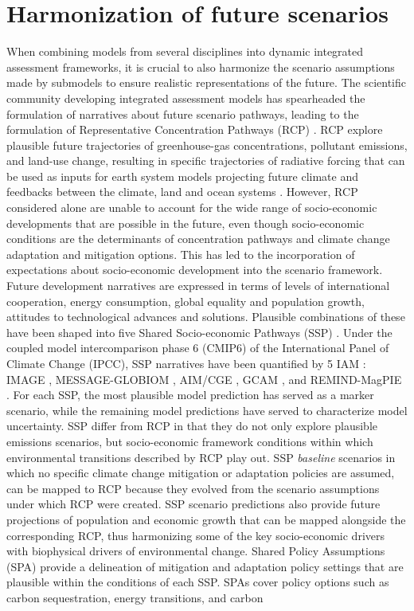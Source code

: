 \section{Harmonization of future scenarios}
When combining models from several disciplines into dynamic integrated assessment frameworks, it is crucial to also harmonize the scenario assumptions made by submodels to ensure realistic representations of the future. The scientific community developing integrated assessment models has spearheaded the formulation of narratives about future scenario pathways, leading to the formulation of Representative Concentration Pathways (RCP) \citep{van_vuuren_representative_2011}. RCP explore plausible future trajectories of greenhouse-gas concentrations, pollutant emissions, and land-use change, resulting in specific trajectories of radiative forcing that can be used as inputs for earth system models projecting future climate and feedbacks between the climate, land and ocean systems \citep{van_vuuren_representative_2011, oneill_mapping_2011}. However, RCP considered alone are unable to account for the wide range of socio-economic developments that are possible in the future, even though socio-economic conditions are the determinants of concentration pathways and climate change adaptation and mitigation options. This has led to the incorporation of expectations about socio-economic development into the scenario framework. Future development narratives are expressed in terms of levels of international cooperation, energy consumption, global equality and population growth, attitudes to technological advances and solutions. Plausible combinations of these have been shaped into five Shared Socio-economic Pathways (SSP) \citep{oneill_new_2014}. Under the coupled model intercomparison phase 6 (CMIP6) of the International Panel of Climate Change (IPCC), SSP narratives have been quantified by 5 IAM \citep{riahi_shared_2017}: IMAGE \citep[SSP1,][]{van_vuuren_energy_2017}, MESSAGE-GLOBIOM \citep[SSP2,][]{fricko_marker_2017}, AIM/CGE \citep[SSP3,][]{fujimori_ssp3_2017}, GCAM \citep[SSP4,][]{calvin_ssp4_2017}, and REMIND-MagPIE \citep[SSP5,][]{kriegler_fossil-fueled_2017}. For each SSP, the most plausible model prediction has served as a marker scenario, while the remaining model predictions have served to characterize model uncertainty. SSP differ from RCP in that they do not only explore plausible emissions scenarios, but socio-economic framework conditions within which environmental transitions described by RCP play out. SSP \textit{baseline} scenarios in which no specific climate change mitigation or adaptation policies are assumed, can be mapped to RCP because they evolved from the scenario assumptions under which RCP were created. SSP scenario predictions also provide future projections of population and economic growth that can be mapped alongside the corresponding RCP, thus harmonizing some of the key socio-economic drivers with biophysical drivers of environmental change. Shared Policy Assumptions (SPA) \citep{kriegler_new_2014} provide a delineation of mitigation and adaptation policy settings that are plausible within the conditions of each SSP. SPAs cover policy options such as carbon sequestration, energy transitions, and carbon 